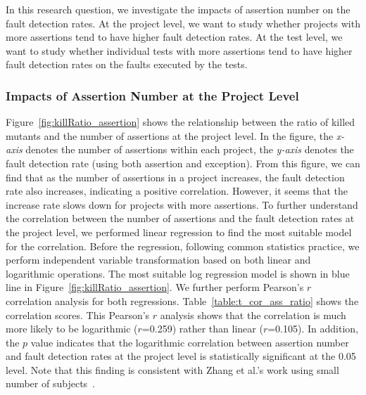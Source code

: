 In this research question, we investigate the impacts of assertion
number on the fault detection rates. At the project level, we want to
study whether projects with more assertions tend to have higher fault
detection rates. At the test level, we want to study whether
individual tests with more assertions tend to have higher fault
detection rates on the faults executed by the tests. 



\subsubsection{Impacts of Assertion Number at the Project Level}
Figure~\ref{fig:killRatio_assertion} shows the relationship between
the ratio of killed mutants and the number of assertions at the
project level. In the figure, the {\em x-axis} denotes the number of
assertions within each project, the {\em y-axis} denotes the fault
detection rate (using both assertion and exception). From this figure,
we can find that as the number of assertions in a project increases,
the fault detection rate also increases, indicating a positive
correlation. However, it seems that the increase rate slows down for
projects with more assertions. To further understand the correlation
between the number of assertions and the fault detection rates at the
project level, we performed linear regression to find the most
suitable model for the correlation. Before the regression, following
common statistics practice, we perform independent variable
transformation based on both linear and logarithmic operations. The
most suitable log regression model is shown in blue line in
Figure~\ref{fig:killRatio_assertion}.
We further perform Pearson's $r$ correlation analysis
for both regressions.  Table~\ref{table:t_cor_ass_ratio} shows the
correlation scores.  This Pearson's $r$ analysis shows that the
correlation is much more likely to be logarithmic ($r$=0.259) rather
than linear ($r$=0.105). In addition, the $p$ value indicates that the
logarithmic correlation between assertion number and fault detection
rates at the project level is statistically significant at the 0.05
level. Note that this finding is consistent with Zhang et al.'s work
using small number of subjects~\cite{zhang2015assertions}.

